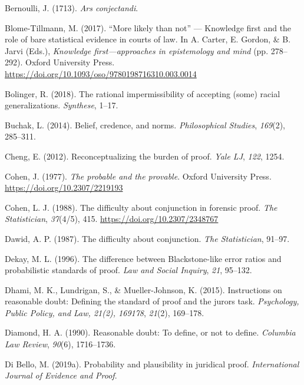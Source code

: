 \documentclass[10pt,dvipsnames,enabledeprecatedfontcommands]{scrartcl}
\begin{document}
\leavevmode\hypertarget{ref-Bernoulli1713Ars-conjectandi}{}%
Bernoulli, J. (1713). \emph{Ars conjectandi}.

\leavevmode\hypertarget{ref-BlomeTillmann2017}{}%
Blome-Tillmann, M. (2017). ``More likely than not'' --- Knowledge first
and the role of bare statistical evidence in courts of law. In A.
Carter, E. Gordon, \& B. Jarvi (Eds.), \emph{Knowledge
first---approaches in epistemology and mind} (pp. 278--292). Oxford
University Press.
\url{https://doi.org/10.1093/oso/9780198716310.003.0014}

\leavevmode\hypertarget{ref-bolinger2018rational}{}%
Bolinger, R. (2018). The rational impermissibility of accepting (some)
racial generalizations. \emph{Synthese}, 1--17.

\leavevmode\hypertarget{ref-buchak2014belief}{}%
Buchak, L. (2014). Belief, credence, and norms. \emph{Philosophical
Studies}, \emph{169}(2), 285--311.

\leavevmode\hypertarget{ref-cheng2012reconceptualizing}{}%
Cheng, E. (2012). Reconceptualizing the burden of proof. \emph{Yale LJ},
\emph{122}, 1254.

\leavevmode\hypertarget{ref-Cohen1977The-probable-an}{}%
Cohen, J. (1977). \emph{The probable and the provable}. Oxford
University Press. \url{https://doi.org/10.2307/2219193}

\leavevmode\hypertarget{ref-cohen1988difficulty}{}%
Cohen, L. J. (1988). The difficulty about conjunction in forensic proof.
\emph{The Statistician}, \emph{37}(4/5), 415.
\url{https://doi.org/10.2307/2348767}

\leavevmode\hypertarget{ref-dawid1987difficulty}{}%
Dawid, A. P. (1987). The difficulty about conjunction. \emph{The
Statistician}, 91--97.

\leavevmode\hypertarget{ref-Dekay1996}{}%
Dekay, M. L. (1996). The difference between Blackstone-like error ratios
and probabilistic standards of proof. \emph{Law and Social Inquiry},
\emph{21}, 95--132.

\leavevmode\hypertarget{ref-dhamiEtAl2015}{}%
Dhami, M. K., Lundrigan, S., \& Mueller-Johnson, K. (2015). Instructions
on reasonable doubt: Defining the standard of proof and the jurors task.
\emph{Psychology, Public Policy, and Law, 21(2), 169178}, \emph{21}(2),
169--178.

\leavevmode\hypertarget{ref-diamond90}{}%
Diamond, H. A. (1990). Reasonable doubt: To define, or not to define.
\emph{Columbia Law Review}, \emph{90}(6), 1716--1736.

\leavevmode\hypertarget{ref-DiBello2019plausibility}{}%
Di Bello, M. (2019a). Probability and plausibility in juridical proof.
\emph{International Journal of Evidence and Proof}.
\end{document}
